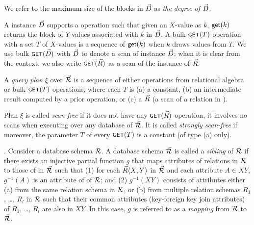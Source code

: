 We refer to
the maximum size of the blocks in $\vec{D}$ as {\em the degree
of $\vec{D}$}.

\vspace{0.6ex}
A \baav instance $\vec{D}$ supports a \get operation such that given
an $X$-value as $k$, $\protect\mathsf{get}(k)$ returns the block of
$Y$-values associated with $k$ in $\vec{D}$.
%
A bulk $\text{\footnotesize \protect\ensuremath{\mathsf{GET}}}(T)$ operation with a set $T$ of $X$-values is a
sequence of $\protect\mathsf{get}(k)$ when $k$ draws values from $T$.
  We use 
bulk $\text{\footnotesize \protect\ensuremath{\mathsf{GET}}}(\vec{D})$ with $\vec{D}$ to denote a scan of \baav instance
$\vec{D}$; when it is clear from the context, we also write
$\text{\footnotesize \protect\ensuremath{\mathsf{GET}}}(\vec{R})$ as a scan of the instance of \bs $\vec{R}$.


A {\em query plan} $\xi$ over $\vec{{\mathcal R}}$ is a sequence
of either operations
from relational algebra or bulk $\text{\footnotesize \protect\ensuremath{\mathsf{GET}}}(T)$ operations, where each $T$ is
(a) a constant, %
(b) an intermediate result computed by a prior operation, or
(c) a \bs $\vec{R}$ (\ie a scan of a relation in \baav).

\vspace{0.36ex}
Plan
$\xi$ is called {\em scan-free} if it does not have any
$\text{\footnotesize \protect\ensuremath{\mathsf{GET}}}(\vec{R})$
operation, \ie it involves no scans when executing over any \baav
database of $\vec{{\mathcal R}}$. It is called {\em strongly scan-free}
if moreover, 
the parameter $T$ of every $\text{\footnotesize \protect\ensuremath{\mathsf{GET}}}(T)$ is a constant (\ie of type (a) only).

\vspace{0.6ex}






.
Consider  a database schema ${\mathcal R}$.
A \baav database schema $\vec{{\mathcal R}}$ is called
a {\em sibling} of ${\mathcal R}$
if there exists an injective partial function $g$ that 
maps attributes of relations in ${\mathcal R}$ to those of \bss in
$\vec{{\mathcal R}}$ such that
(1) for each $\vec{R}\langle X,\allowbreak Y\rangle$ in $\vec{{\mathcal R}}$ and each
attribute $A\in XY$, $g^{-1}(A)$ is an attribute of of ${\mathcal R}$;
and (2) $g^{-1}(XY)$ consists of attributes either
(a) from the same relation schema in ${\mathcal R}$, or
(b) from multiple relation schemas $R_{1}$, \ldots, $R_{l}$ in
${\mathcal R}$ such that their common attributes (\ie key-foreign
key join attributes) of $R_{1}$, \ldots, $R_{l}$ are also in $XY$.
In this case, $g$ is referred to as a {\em mapping} from ${\mathcal R}$ to
$\vec{{\mathcal R}}$.



